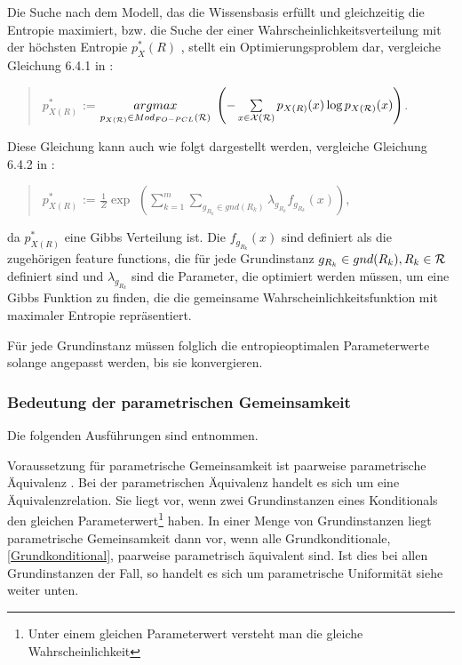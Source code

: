 \documentclass[a4paper, 11pt]{book}
\begin{document}
Die Suche nach dem Modell, das die Wissensbasis erfüllt und gleichzeitig die Entropie maximiert, bzw. die Suche der einer Wahrscheinlichkeitsverteilung mit der höchsten Entropie $ p^*_X(R) $ , stellt ein Optimierungsproblem dar, vergleiche Gleichung 6.4.1 in \cite{Fis10}:
\begin{quote}
$ p^{*}_{X(R)} $ := $ \underset{p_{X(\cal{R})}\in Mod_{FO-PCL}(\cal{R})}{argmax} $
$ \left(- \sum\limits_{x \in \cal{X(R)}}p_{X(R)}(x)\log p_{X(\cal{R})} (x)\right) $$ $.\\
\end{quote}
Diese Gleichung kann auch wie folgt dargestellt werden, vergleiche Gleichung 6.4.2 in \cite{Fis10}:
\begin{quote}
$ p^{*}_{X(R)} $ := $ \frac{1}{Z} \exp $
$ \left(\sum\limits_{k=1}^{m} \sum\limits_{g_{R_{k}} \in gnd(R_{k})} \lambda_{g_{R_{k}}} f_{g_{R_{k}}}(x)\right) $$ $,\\
\end{quote}
da $ p^{*}_{X(R)} $ eine Gibbs Verteilung ist. Die $ f_{g_{R_{k}}}(x) $ sind definiert als die zugehörigen feature functions, die für jede Grundinstanz $ g_{R_{k}} \in gnd(R_{k}), R_{k} \in \cal{R} $ definiert sind und $ \lambda_{g_{R_{k}}}  $ sind die Parameter, die optimiert werden müssen, um eine Gibbs Funktion zu finden, die die gemeinsame Wahrscheinlichkeitsfunktion mit maximaler Entropie repräsentiert.

Für jede Grundinstanz müssen folglich die entropieoptimalen Parameterwerte solange angepasst werden, bis sie konvergieren. 

\subsubsection{Bedeutung der parametrischen Gemeinsamkeit}  
\label{sec:parÄ}
Die folgenden Ausführungen sind \cite[Kap. 7.1, S. 148ff]{Fis10} entnommen.

Voraussetzung für parametrische Gemeinsamkeit ist paarweise parametrische Äquivalenz . Bei der parametrischen Äquivalenz  handelt es sich um eine Äquivalenzrelation. Sie liegt vor, wenn zwei Grundinstanzen eines Konditionals den gleichen Parameterwert\footnote{Unter einem gleichen Parameterwert versteht man die gleiche Wahrscheinlichkeit} haben. In einer Menge von Grundinstanzen liegt parametrische Gemeinsamkeit dann vor, wenn alle Grundkonditionale, \ref{Grundkonditional},  paarweise parametrisch äquivalent sind. Ist dies bei allen Grundinstanzen der Fall, so handelt es sich um parametrische Uniformität siehe weiter unten.
\end{document}
